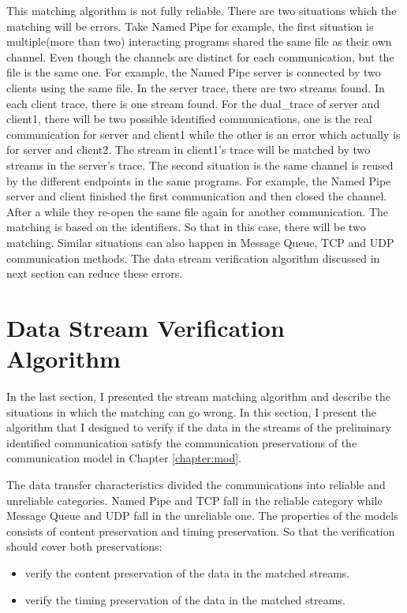 This matching algorithm is not fully reliable. There are two situations which the matching will be errors. Take Named Pipe for example, the first situation is multiple(more than two) interacting programs shared the same file as their own channel. Even though the channels are distinct for each communication, but the file is the same one. For example, the Named Pipe server is connected by two clients using the same file. In the server trace, there are two streams found. In each client trace, there is one stream found. For the dual\_trace of server and client1, there will be two possible identified communications, one is the real communication for server and client1 while the other is an error which actually is for server and client2. The stream in client1's trace will be matched by two streams in the server's trace. The second situation is the same channel is reused by the different endpoints in the same programs. For example, the Named Pipe server and client finished the first communication and then closed the channel. After a while they re-open the same file again for another communication. The matching is based on the identifiers. So that in this case, there will be two matching. Similar situations can also happen in Message Queue, TCP and UDP communication methods. The data stream verification algorithm discussed in next section can reduce these errors. 

\section{Data Stream Verification Algorithm}\label{verfication}
In the last section, I presented the stream matching algorithm and describe the situations in which the matching can go wrong. In this section, I present the algorithm that I designed to verify if the data in the streams of the preliminary identified communication satisfy the communication preservations of the communication model in Chapter \ref{chapter:mod}. 

The data transfer characteristics divided the communications into reliable and unreliable categories. Named Pipe and TCP fall in the reliable category while Message Queue and UDP fall in the unreliable one. The properties of the models consists of content preservation and timing preservation. So that the verification should cover both preservations: 
\begin{itemize}
\item verify the content preservation of the data in the matched streams. 
\item verify the timing preservation of the data in the matched streams. 
\end{itemize}

